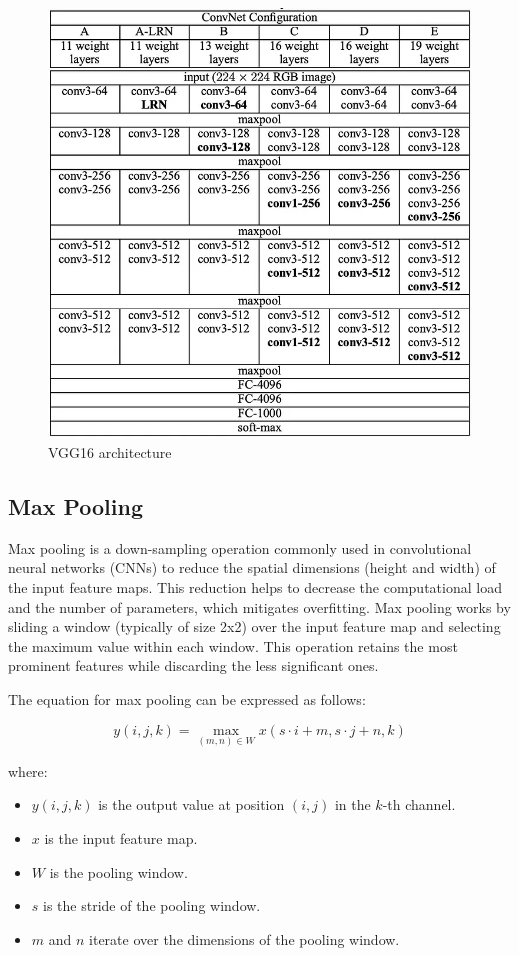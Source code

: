 \begin{figure}[h!]
    \centering
    \includegraphics[scale=0.5]{images/VGG16.png}
    \caption{VGG16 architecture}%
\end{figure}
\newpage

\subsection{Max Pooling}

Max pooling is a down-sampling operation commonly used in convolutional neural
networks (CNNs) to reduce the spatial dimensions (height and width) of the
input feature maps. This reduction helps to decrease the computational load and
the number of parameters, which mitigates overfitting. Max pooling works by
sliding a window (typically of size 2x2) over the input feature map and
selecting the maximum value within each window. This operation retains the most
prominent features while discarding the less significant ones.

The equation for max pooling can be expressed as follows:

\[
    y(i, j, k) = \max_{(m, n) \in W} x(s \cdot i + m, s \cdot j + n, k)
\]

where:
\begin{itemize}
    \item \( y(i, j, k) \) is the output value at position \((i, j)\) in the \(k\)-th channel.
    \item \( x \) is the input feature map.
    \item \( W \) is the pooling window.
    \item \( s \) is the stride of the pooling window.
    \item \( m \) and \( n \) iterate over the dimensions of the pooling window.
\end{itemize}

